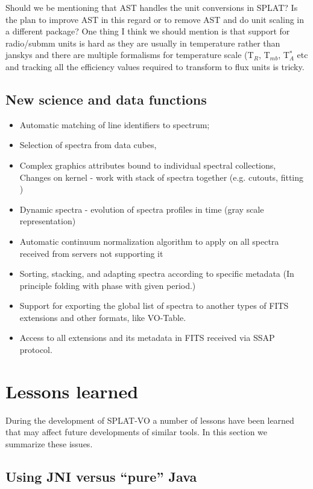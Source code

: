 \documentclass[final,authoryear,5p,times,twocolumn]{elsarticle}
\begin{document}
{\color{red} Should we be mentioning that AST handles the unit
  conversions in SPLAT? Is the plan to improve AST in this regard or
  to remove AST and do unit scaling in a different package? One thing
  I think we should mention is that support for radio/submm units is
  hard as they are usually in temperature rather than janskys and
  there are multiple formalisms for temperature scale (T$_R$,
  T$_{mb}$, T$^*_A$ etc and tracking all the efficiency values
  required to transform to flux units is tricky.}


\subsection{New science and data functions}
\begin{itemize}
\item Automatic matching of line identifiers to spectrum;
\item Selection of spectra from data cubes,
\item Complex graphics attributes bound to individual spectral collections, Changes on kernel - work with stack of spectra together (e.g. cutouts, fitting )
\item Dynamic spectra - evolution of spectra profiles in time (gray scale representation)
\item Automatic continuum normalization algorithm to apply on all spectra received from servers not supporting it
\item Sorting, stacking, and adapting spectra according to specific metadata (In principle folding with phase with given period.)
\item Support for exporting the global list of spectra to another types of FITS extensions and other formats, like VO-Table.
\item Access to all extensions and its metadata in FITS received via SSAP protocol.

\end{itemize}

\section{Lessons learned}

During the development of SPLAT-VO a number of lessons have been
learned that may affect future developments of similar tools. In this
section we summarize these issues.

\subsection{Using JNI versus ``pure'' Java}
\end{document}
